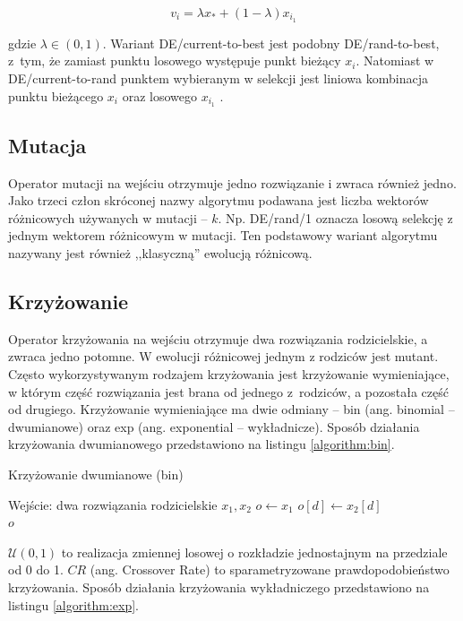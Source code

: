 \documentclass[a4paper,onecolumn,oneside,12pt,wide,floatssmall]{mwrep}
\theoremstyle{definition}
\theoremstyle{plain}%
\theoremstyle{remark}
\begin{document}
$$ v_i = \lambda x_* + (1 - \lambda)x_{i_1} $$

gdzie $\lambda \in (0, 1)$. Wariant DE/current-to-best jest podobny DE/rand-to-best, z~tym, że zamiast punktu
losowego występuje punkt bieżący $x_i$.
Natomiast w DE/current-to-rand punktem wybieranym w selekcji jest liniowa kombinacja 
punktu bieżącego $x_i$ oraz losowego $x_{i_1}$ \cite{zaharie}.

\subsection{Mutacja}

Operator mutacji na wejściu otrzymuje jedno rozwiązanie i zwraca również jedno.
Jako trzeci człon skróconej nazwy algorytmu
podawana jest liczba wektorów różnicowych używanych w mutacji -- $k$.
Np. DE/rand/1 oznacza losową selekcję z jednym wektorem różnicowym w mutacji.
Ten podstawowy wariant algorytmu nazywany jest również ,,klasyczną'' ewolucją różnicową. 

\subsection{Krzyżowanie}
\label{sec:krzyzowanie}

Operator krzyżowania na wejściu otrzymuje dwa rozwiązania rodzicielskie, a zwraca jedno potomne. 
W ewolucji różnicowej jednym z rodziców jest mutant. 
Często wykorzystywanym rodzajem krzyżowania jest krzyżowanie wymieniające, w którym 
część rozwiązania jest brana od jednego z rodziców, a pozostała część od drugiego. 
Krzyżowanie wymieniające ma dwie odmiany -- bin (ang. binomial -- dwumianowe) oraz 
exp (ang. exponential -- wykładnicze). Sposób działania krzyżowania dwumianowego przedstawiono na listingu \ref{algorithm:bin}.

\begin{algorithm}[H]
\caption{Krzyżowanie dwumianowe (bin)}
\label{algorithm:bin}
\begin{algorithmic}[1]
\State Wejście: dwa rozwiązania rodzicielskie $x_1, x_2$ 
\State $o \gets x_1$
    \State $o[d] \gets x_2[d]$     
  \EndIf 
\EndFor \\
\Return $o$
\end{algorithmic}
\end{algorithm}

$\mathcal{U}(0, 1)$ to realizacja zmiennej losowej o rozkładzie jednostajnym na przedziale od 0 do 1.
$CR$ (ang. Crossover Rate) to sparametryzowane prawdopodobieństwo krzyżowania. 
Sposób działania krzyżowania wykładniczego przedstawiono na listingu \ref{algorithm:exp}.
\end{document}
